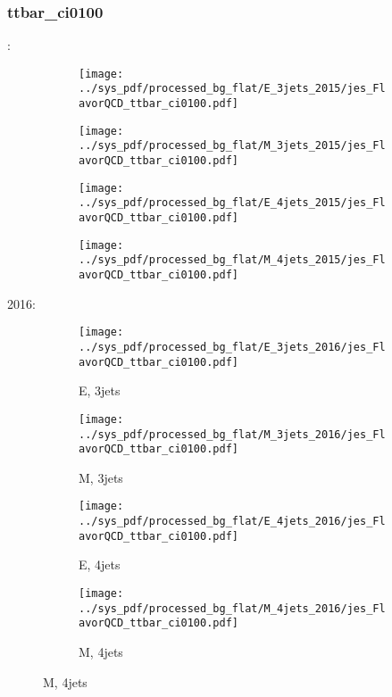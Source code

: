 \documentclass{beamer}
\begin{document}
\begin{frame}
\frametitle{ttbar_ci0100}
\fontsize{5}{1}:
\begin{figure}
\centering
\begin{subfigure}[b]{0.24\textwidth}
\texttt{[image: ../sys\_pdf/processed\_bg\_flat/E\_3jets\_2015/jes\_FlavorQCD\_ttbar\_ci0100.pdf]}
\end{subfigure}
\begin{subfigure}[b]{0.24\textwidth}
\texttt{[image: ../sys\_pdf/processed\_bg\_flat/M\_3jets\_2015/jes\_FlavorQCD\_ttbar\_ci0100.pdf]}
\end{subfigure}
\begin{subfigure}[b]{0.24\textwidth}
\texttt{[image: ../sys\_pdf/processed\_bg\_flat/E\_4jets\_2015/jes\_FlavorQCD\_ttbar\_ci0100.pdf]}
\end{subfigure}
\begin{subfigure}[b]{0.24\textwidth}
\texttt{[image: ../sys\_pdf/processed\_bg\_flat/M\_4jets\_2015/jes\_FlavorQCD\_ttbar\_ci0100.pdf]}
\end{subfigure}
\end{figure}
2016:
\begin{figure}
\centering
\begin{subfigure}[b]{0.24\textwidth}
\texttt{[image: ../sys\_pdf/processed\_bg\_flat/E\_3jets\_2016/jes\_FlavorQCD\_ttbar\_ci0100.pdf]}
\captionsetup{font=tiny}
\caption{E, 3jets}
\end{subfigure}
\begin{subfigure}[b]{0.24\textwidth}
\texttt{[image: ../sys\_pdf/processed\_bg\_flat/M\_3jets\_2016/jes\_FlavorQCD\_ttbar\_ci0100.pdf]}
\captionsetup{font=tiny}
\caption{M, 3jets}
\end{subfigure}
\begin{subfigure}[b]{0.24\textwidth}
\texttt{[image: ../sys\_pdf/processed\_bg\_flat/E\_4jets\_2016/jes\_FlavorQCD\_ttbar\_ci0100.pdf]}
\captionsetup{font=tiny}
\caption{E, 4jets}
\end{subfigure}
\begin{subfigure}[b]{0.24\textwidth}
\texttt{[image: ../sys\_pdf/processed\_bg\_flat/M\_4jets\_2016/jes\_FlavorQCD\_ttbar\_ci0100.pdf]}
\captionsetup{font=tiny}
\caption{M, 4jets}
\end{subfigure}
\end{figure}
\end{frame}
\end{document}
